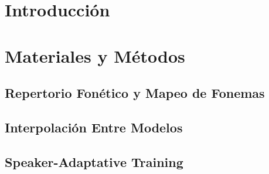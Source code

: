 \documentclass[11pt,a4paper,twoside]{tesis}
\begin{document}

\def\autor{Franco Negri}
\def\tituloTesis{Implementación y evaluación de un sistema de síntesis de habla con acento extranjero variable}
\def\runtitle{Implementacíón y evaluación de un sistema de sintesis de habla}
\def\director{Agustín Gravano}
\def\lugar{Buenos Aires, 2018}


\frontmatter

\pagestyle{empty}
%
\cleardoublepage
\cleardoublepage

\cleardoublepage
\tableofcontents

\mainmatter
\pagestyle{headings}

%
\chapter{Introducción}

\chapter{Materiales y Métodos}


\section{Repertorio Fonético y Mapeo de Fonemas}


\section{Interpolación Entre Modelos}


\section{Speaker-Adaptative Training}

\end{document}
